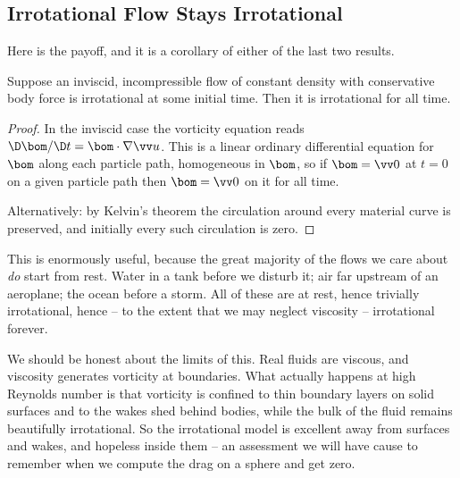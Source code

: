 \subsection{Irrotational Flow Stays Irrotational}

Here is the payoff, and it is a corollary of either of the last two results.

\begin{corollary}
	Suppose an inviscid, incompressible flow of constant density with conservative body force is irrotational at some initial time. Then it is irrotational for all time.
\end{corollary}
\begin{proof}
	In the inviscid case the vorticity equation reads $\D\bom/\D t = \bom\cdot\nabla\vv u$. This is a linear ordinary differential equation for $\bom$ along each particle path, homogeneous in $\bom$, so if $\bom = \vv 0$ at $t = 0$ on a given particle path then $\bom = \vv 0$ on it for all time.

	Alternatively: by Kelvin's theorem the circulation around every material curve is preserved, and initially every such circulation is zero. \qedhere
\end{proof}

This is enormously useful, because the great majority of the flows we care about \emph{do} start from rest. Water in a tank before we disturb it; air far upstream of an aeroplane; the ocean before a storm. All of these are at rest, hence trivially irrotational, hence -- to the extent that we may neglect viscosity -- irrotational forever.

We should be honest about the limits of this. Real fluids are viscous, and viscosity generates vorticity at boundaries. What actually happens at high Reynolds number is that vorticity is confined to thin boundary layers on solid surfaces and to the wakes shed behind bodies, while the bulk of the fluid remains beautifully irrotational. So the irrotational model is excellent away from surfaces and wakes, and hopeless inside them -- an assessment we will have cause to remember when we compute the drag on a sphere and get zero.

\begin{center}
\end{center}

